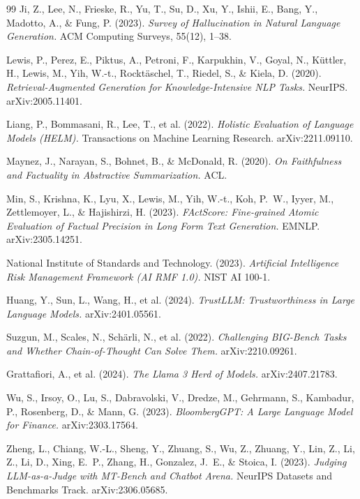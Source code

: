 \documentclass[11pt]{article}
\begin{document}
\begin{thebibliography}{99}
Ji, Z., Lee, N., Frieske, R., Yu, T., Su, D., Xu, Y., Ishii, E., Bang, Y., Madotto, A., \& Fung, P. (2023).
\textit{Survey of Hallucination in Natural Language Generation.} ACM Computing Surveys, 55(12), 1--38.

Lewis, P., Perez, E., Piktus, A., Petroni, F., Karpukhin, V., Goyal, N., K\"uttler, H., Lewis, M., Yih, W.-t., Rockt\"aschel, T., Riedel, S., \& Kiela, D. (2020).
\textit{Retrieval-Augmented Generation for Knowledge-Intensive NLP Tasks.} NeurIPS. arXiv:2005.11401.

Liang, P., Bommasani, R., Lee, T., et al. (2022).
\textit{Holistic Evaluation of Language Models (HELM).} Transactions on Machine Learning Research. arXiv:2211.09110.

Maynez, J., Narayan, S., Bohnet, B., \& McDonald, R. (2020).
\textit{On Faithfulness and Factuality in Abstractive Summarization.} ACL.

Min, S., Krishna, K., Lyu, X., Lewis, M., Yih, W.-t., Koh, P.~W., Iyyer, M., Zettlemoyer, L., \& Hajishirzi, H. (2023).
\textit{FActScore: Fine-grained Atomic Evaluation of Factual Precision in Long Form Text Generation.} EMNLP. arXiv:2305.14251.

National Institute of Standards and Technology. (2023).
\textit{Artificial Intelligence Risk Management Framework (AI RMF 1.0).} NIST AI 100-1.

Huang, Y., Sun, L., Wang, H., et al. (2024).
\textit{TrustLLM: Trustworthiness in Large Language Models.} arXiv:2401.05561.

Suzgun, M., Scales, N., Sch\"arli, N., et al. (2022).
\textit{Challenging BIG-Bench Tasks and Whether Chain-of-Thought Can Solve Them.} arXiv:2210.09261.

Grattafiori, A., et al. (2024).
\textit{The Llama 3 Herd of Models.} arXiv:2407.21783.

Wu, S., Irsoy, O., Lu, S., Dabravolski, V., Dredze, M., Gehrmann, S., Kambadur, P., Rosenberg, D., \& Mann, G. (2023).
\textit{BloombergGPT: A Large Language Model for Finance.} arXiv:2303.17564.

Zheng, L., Chiang, W.-L., Sheng, Y., Zhuang, S., Wu, Z., Zhuang, Y., Lin, Z., Li, Z., Li, D., Xing, E.~P., Zhang, H., Gonzalez, J.~E., \& Stoica, I. (2023).
\textit{Judging LLM-as-a-Judge with MT-Bench and Chatbot Arena.} NeurIPS Datasets and Benchmarks Track. arXiv:2306.05685.


\end{thebibliography}
\end{document}
